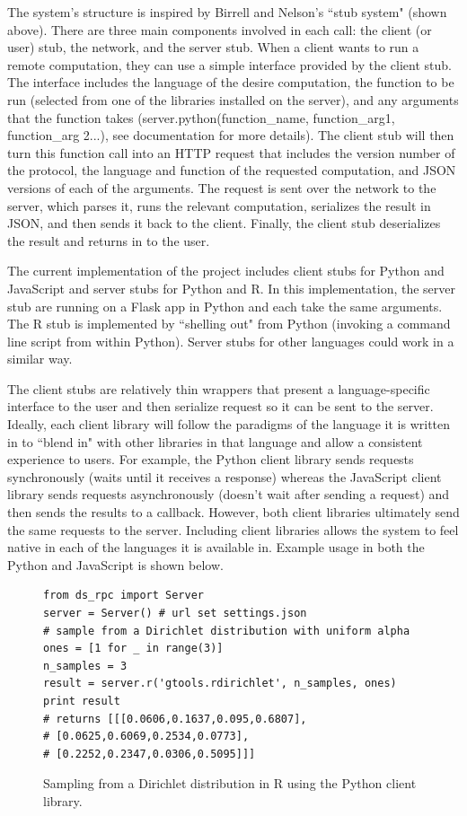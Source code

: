 \documentclass[11pt]{article}
\begin{document}
The system's structure is inspired by Birrell and Nelson's ``stub system" (shown above). There are three main components involved in each call: the client (or user) stub, the network, and the server stub. When a client wants to run a remote computation, they can use a simple interface provided by the client stub. The interface includes the language of the desire computation, the function to be run (selected from one of the libraries installed on the server), and any arguments that the function takes (server.python(function\_name, function\_arg1, function\_arg 2...), see documentation for more details).  The client stub will then turn this function call into an HTTP request that includes the version number of the protocol, the language and function of the requested computation, and JSON versions of each of the arguments. The request is sent over the network to the server, which parses it, runs the relevant computation, serializes the result in JSON, and then sends it back to the client. Finally, the client stub deserializes the result and returns in to the user. 

The current implementation of the project includes client stubs for Python and JavaScript and server stubs for Python and R. In this implementation, the server stub are running on a Flask app in Python and each take the same arguments. The R stub is implemented by ``shelling out" from Python (invoking a command line script from within Python). Server stubs for other languages could work in a similar way. 

The client stubs are relatively thin wrappers that present a language-specific interface to the user and then serialize request so it can be sent to the server. Ideally, each client library will follow the paradigms of the language it is written in to ``blend in" with other libraries in that language and allow a consistent experience to users.  For example, the Python client library sends requests synchronously (waits until it receives a response) whereas the JavaScript client library sends requests asynchronously (doesn't wait after sending a request) and then sends the results to a callback. However, both client libraries ultimately send the same requests to the server. Including client libraries allows the system to feel native in each of the languages it is available in. Example usage in both the Python and JavaScript is shown below. 

\begin{figure}[!ht]
  \centering
     \lstset{language=Python}
\begin{lstlisting}
from ds_rpc import Server
server = Server() # url set settings.json
# sample from a Dirichlet distribution with uniform alpha
ones = [1 for _ in range(3)]
n_samples = 3
result = server.r('gtools.rdirichlet', n_samples, ones)
print result
# returns [[[0.0606,0.1637,0.095,0.6807],
# [0.0625,0.6069,0.2534,0.0773],
# [0.2252,0.2347,0.0306,0.5095]]]
\end{lstlisting}  \caption{Sampling from a Dirichlet distribution in R using the Python client library. }
\end{figure}
\end{document}
